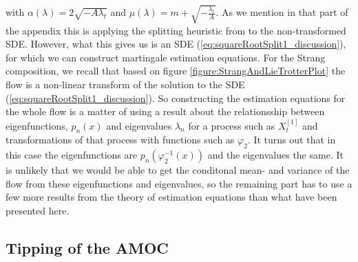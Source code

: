 with $\alpha(\lambda) = 2\sqrt{-A\lambda_t}$ and $\mu(\lambda) = m + \sqrt{-\frac{\lambda_t}{A}}$. As we mention in that part of the appendix this is applying the splitting heuristic from \cite{SplittingSchemes} to the non-transformed SDE. However, what this gives us is an SDE (\ref{eq:squareRootSplit1_discussion}), for which we can construct martingale estimation equations. For the Strang composition, we recall that based on figure \ref{figure:StrangAndLieTrotterPlot} the flow is a non-linear transform of the solution to the SDE (\ref{eq:squareRootSplit1_discussion}). So constructing the estimation equations for the whole flow is a matter of using a result about the relationsship between eigenfunctions, $p_n(x)$ and eigenvalues $\lambda_n$ for a process such as $X_t^{[1]}$ and transformations of that process with functions such as $\varphi_2$. It turns out \cite[remark on p. 41]{StatisticalMethodsForSDE} that in this case the eigenfunctions are $p_n\left(\varphi_2^{-1}(x)\right)$ and the eigenvalues the same. It is unlikely that we would be able to get the conditonal mean- and variance  of the flow from these eigenfunctions and eigenvalues, so the remaining part has to use a few more results from the theory of estimation equations than what have been presented here.
\subsection{Tipping of the AMOC}